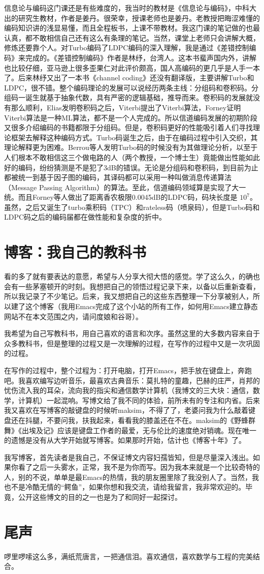 \documentclass[10pt,a4paper,UTF8]{article}
\begin{document}
信息论与编码这门课还是有些难度的，我当时的教材是《信息论与编码》，中科大出的研究生教材，作者是姜丹。很荣幸，授课老师也是姜丹。老教授把晦涩难懂的编码知识讲的浅显易懂，而且全程板书，上课不带教材。我这门课的笔记做的也最认真，都不敢相信自己还有这么有条理的笔记。当然，课堂上老师只会讲解大概，修炼还要靠个人。对Turbo编码了LDPC编码的深入理解，我是通过《差错控制编码》来完成的。《差错控制编码》作者是林纾，台湾人。这本书蜚声国内外，讲解也比较仔细，亚马逊上很多歪果仁对此评价颇高，国人高编码的更几乎是人手一本了。后来林纾又出了一本书《channel coding》还没有翻译版，主要讲解Turbo和LDPC，很不错。整个编码理论的发展可以说经历两条主线：分组码和卷积码。分组码一诞生就基于抽象代数，具有严密的逻辑基础，推导而来。卷积码的发展就没有那么顺利，Elias发明卷积码之后，Viterbi提出了Viterbi算法，Forney证明Viterbi算法是一种ML算法，都不是一个人完成的。所以信道编码发展的初期阶段又很多介绍编码的书籍都限于分组码。但是，卷积码更好的性能吸引着人们寻找理论框架去解释这种编码方式。Turbo码诞生之后，由于在编码过程中引入交织，其理论解释更为困难。Berrou等人发明Turbo码的时候没有为其做理论分析，以至于人们根本不敢相信这三个做电路的人（两个教授，一个博士生）竟能做出性能如此好的编码，纷纷猜测是不是犯了3dB的错误。无论是分组码和卷积码，到目前为止都被统一到基于因子图的编码，其译码都可以采用一种叫做消息传递算法（Message Passing Algorithm）的算法。至此，信道编码领域算是实现了大一统。而且Forney等人做出了距离香农极限0.0045dB的LDPC码，码块长度是 \(10^{7}\)。虽然，之后又诞生了turbo乘积码（TPC）和rateless码（喷泉码），但是Turbo码和LDPC码之后的编码届都在做性能和复杂度的折中。

\section{博客：我自己的教科书}
\label{sec:orgheadline5}


看的多了就有要表达的意愿，希望与人分享大彻大悟的感觉。学了这么久，的确也会有一些茅塞顿开的时刻。我想把自己的领悟过程记录下来，以备以后重新查看，所以我记录了不少笔记。后来，我又想把自己的这些东西整理一下分享被别人，所以建了这个博客（我用Emacs完成了这个小站的所有工作，如何用Emacs建立静态网站不在本文范围之内，请问度娘和谷哥）。

我希望为自己写教科书，用自己喜欢的语言和次序。虽然这里的大多数内容来自于众多教科书，但是整理的过程又是一次理解的过程，在写作的过程中又是一次巩固的过程。

在写作的过程中，整个过程为：打开电脑，打开Emacs，把手放在键盘上，奔跑吧。我喜欢编写边听音乐，最喜欢古典音乐：莫扎特的童趣，巴赫的庄严，肖邦的忧伤流入我的耳朵，流向我的指尖和通信数学计算机（我博文的三大块：通信，数学，计算机）一起混响。写博文给了我不同的体验，前所未有的专注和内省。后来我又喜欢在写博客的敲键盘的时候听maksim，不得了了，老婆问我为什么敲着键盘还在抖腿，不要问我，扶我起来，看看我的膝盖还在不在。maksim的《野蜂群舞》《出埃及记》应该是键盘工作者的最爱，无与伦比的速度绝对销魂。现在唯一的遗憾是没有从大学开始就写博客。如果那时开始，估计也《博客十年》了。

我写博客，首先读者是我自己，不保证博文内容妇孺皆知，但是尽量深入浅出。如果你看了之后一头雾水，正常，我不是为你而写。因为我本来就是一个比较奇特的人，别的不说，单单是最Emacs的热情，我的朋友圈里除了我没别人了。当然，我也不是冷酷无情的“鳄鱼”，如果你想和我交流，请给我留言，我非常欢迎的。毕竟，公开这些博文的目的之一也是为了和同好一起探讨。
\section{尾声}
\label{sec:orgheadline6}


啰里啰嗦这么多，满纸荒唐言，一把通信泪。喜欢通信，喜欢数学与工程的完美结合。
\end{document}
